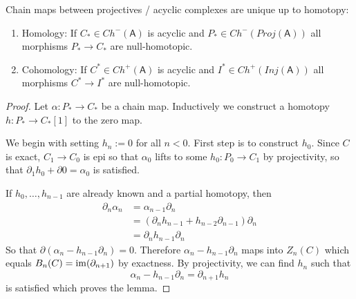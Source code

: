 \documentclass[fontsize=11pt,fleqn,a4paper]{scrartcl}
\begin{document}
\begin{lemma}
Chain maps between projectives / acyclic complexes are unique up to homotopy:
\begin{multicols}{2}
\begin{enumerate}
\item Homology: If $C_\ast\in Ch^-(\mathsf{A})$ is acyclic and $P_\ast\in Ch^-(Proj(\mathsf{A}))$ all morphisms $P_\ast\to C_\ast$ are null-homotopic.
\item Cohomology: If $C^\ast\in Ch^+(\mathsf{A})$ is acyclic and $I^\ast\in Ch^+(Inj(\mathsf{A}))$ all morphisms $C^\ast \to I^\ast$ are null-homotopic.
\end{enumerate}
\end{multicols}
\end{lemma}
\begin{proof}
Let $\alpha: P_\ast\to C_\ast$ be a chain map. Inductively we construct a homotopy $h:P_\ast\to C_\ast[1]$ to the zero map.


We begin with setting $h_n:=0$ for all $n<0$. First step is to construct $h_0$. Since $C$ is exact, $C_1\to C_0$ is epi so that $\alpha_0$ lifts to some $h_0: P_0 \to C_1$ by projectivity, so that $\partial_1 h_0 + \partial 0 = \alpha_0$ is satisfied.

If $h_0,\ldots,h_{n-1}$ are already known and a partial homotopy, then
\begin{align*}
\partial_n\alpha_n &= \alpha_{n-1}\partial_n \\
&=(\partial_n h_{n-1} + h_{n-2} \partial_{n-1})\partial_n \\
&=\partial_n h_{n-1} \partial_n
\end{align*}
So that $\partial(\alpha_n - h_{n-1}\partial_n)=0$. Therefore $\alpha_n-h_{n-1}\partial_n$ maps into $Z_n(C)$ which equals $B_n(C)=\operatorname{im}(\partial_{n+1})$ by exactness. By projectivity, we can find $h_n$ such that
\[\alpha_n - h_{n-1}\partial_n = \partial_{n+1} h_n\]
is satisfied which proves the lemma.
\end{proof}
\end{document}
